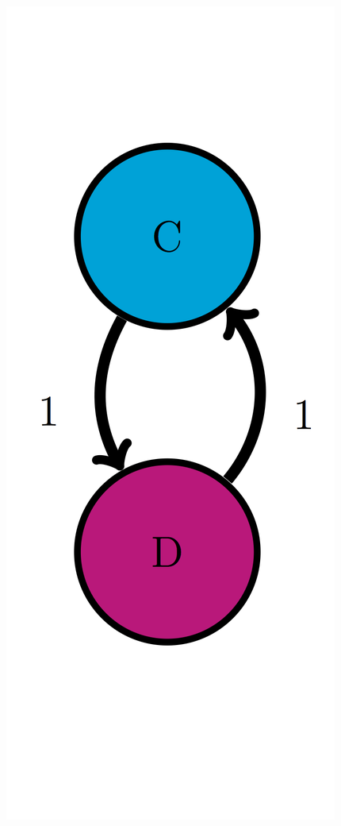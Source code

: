 \documentclass[
]{book}
\theoremstyle{definition}
\theoremstyle{definition}
\theoremstyle{definition}
\theoremstyle{remark}
\begin{document}
\includegraphics{ch10/CD_trans_diag.png}
\end{document}
